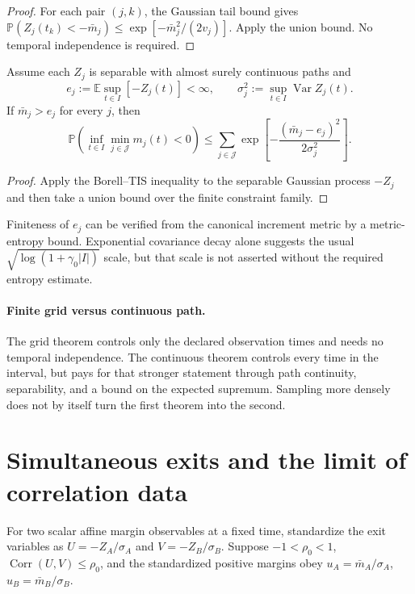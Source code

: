 \documentclass[11pt]{article}
\begin{document}
\begin{proof}
For each pair $(j,k)$, the Gaussian tail bound gives
$\mathbb P(Z_j(t_k)<-\bar m_j)\le
\exp[-\bar m_j^2/(2v_j)]$. Apply the union bound. No temporal independence is
required.
\end{proof}

\begin{theorem}\label{thm:continuous}
Assume each $Z_j$ is separable with almost surely continuous paths and
\[
 e_j:=\mathbb E\sup_{t\in I}[-Z_j(t)]<\infty,
 \qquad \sigma_j^2:=\sup_{t\in I}\operatorname{Var}Z_j(t).
\]
If $\bar m_j>e_j$ for every $j$, then
\[
 \mathbb P\!\left(\inf_{t\in I}\min_{j\in\mathcal J}m_j(t)<0\right)
 \le
 \sum_{j\in\mathcal J}
 \exp\!\left[-\frac{(\bar m_j-e_j)^2}{2\sigma_j^2}\right].
\]
\end{theorem}

\begin{proof}
Apply the Borell--TIS inequality to the separable Gaussian process $-Z_j$ and
then take a union bound over the finite constraint family.
\end{proof}

Finiteness of $e_j$ can be verified from the canonical increment metric by a
metric-entropy bound. Exponential covariance decay alone suggests the usual
$\sqrt{\log(1+\gamma_0|I|)}$ scale, but that scale is not asserted without the
required entropy estimate.

\paragraph{Finite grid versus continuous path.}
The grid theorem controls only the declared observation times and needs no
temporal independence.  The continuous theorem controls every time in the
interval, but pays for that stronger statement through path continuity,
separability, and a bound on the expected supremum.  Sampling more densely
does not by itself turn the first theorem into the second.

\section{Simultaneous exits and the limit of correlation data}

For two scalar affine margin observables at a fixed time, standardize the
exit variables as $U=-Z_A/\sigma_A$ and $V=-Z_B/\sigma_B$. Suppose
$-1<\rho_0<1$, $\operatorname{Corr}(U,V)\le\rho_0$, and the standardized positive margins
obey $u_A=\bar m_A/\sigma_A$, $u_B=\bar m_B/\sigma_B$.
\end{document}
